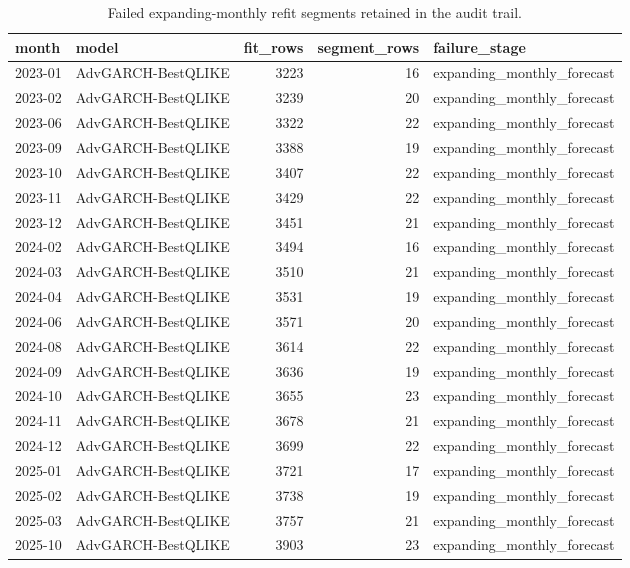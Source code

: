 \begin{table}[!t]
\centering
\caption{Failed expanding-monthly refit segments retained in the audit trail.}
\label{tab:refit-failure-taxonomy}
\scriptsize
\begin{tabular}{@{}llrrl@{}}
\toprule
month & model & fit\_rows & segment\_rows & failure\_stage \\
\midrule
2023-01 & AdvGARCH-BestQLIKE & 3223 & 16 & expanding\_monthly\_forecast \\
2023-02 & AdvGARCH-BestQLIKE & 3239 & 20 & expanding\_monthly\_forecast \\
2023-06 & AdvGARCH-BestQLIKE & 3322 & 22 & expanding\_monthly\_forecast \\
2023-09 & AdvGARCH-BestQLIKE & 3388 & 19 & expanding\_monthly\_forecast \\
2023-10 & AdvGARCH-BestQLIKE & 3407 & 22 & expanding\_monthly\_forecast \\
2023-11 & AdvGARCH-BestQLIKE & 3429 & 22 & expanding\_monthly\_forecast \\
2023-12 & AdvGARCH-BestQLIKE & 3451 & 21 & expanding\_monthly\_forecast \\
2024-02 & AdvGARCH-BestQLIKE & 3494 & 16 & expanding\_monthly\_forecast \\
2024-03 & AdvGARCH-BestQLIKE & 3510 & 21 & expanding\_monthly\_forecast \\
2024-04 & AdvGARCH-BestQLIKE & 3531 & 19 & expanding\_monthly\_forecast \\
2024-06 & AdvGARCH-BestQLIKE & 3571 & 20 & expanding\_monthly\_forecast \\
2024-08 & AdvGARCH-BestQLIKE & 3614 & 22 & expanding\_monthly\_forecast \\
2024-09 & AdvGARCH-BestQLIKE & 3636 & 19 & expanding\_monthly\_forecast \\
2024-10 & AdvGARCH-BestQLIKE & 3655 & 23 & expanding\_monthly\_forecast \\
2024-11 & AdvGARCH-BestQLIKE & 3678 & 21 & expanding\_monthly\_forecast \\
2024-12 & AdvGARCH-BestQLIKE & 3699 & 22 & expanding\_monthly\_forecast \\
2025-01 & AdvGARCH-BestQLIKE & 3721 & 17 & expanding\_monthly\_forecast \\
2025-02 & AdvGARCH-BestQLIKE & 3738 & 19 & expanding\_monthly\_forecast \\
2025-03 & AdvGARCH-BestQLIKE & 3757 & 21 & expanding\_monthly\_forecast \\
2025-10 & AdvGARCH-BestQLIKE & 3903 & 23 & expanding\_monthly\_forecast \\
\bottomrule
\end{tabular}
\end{table}

